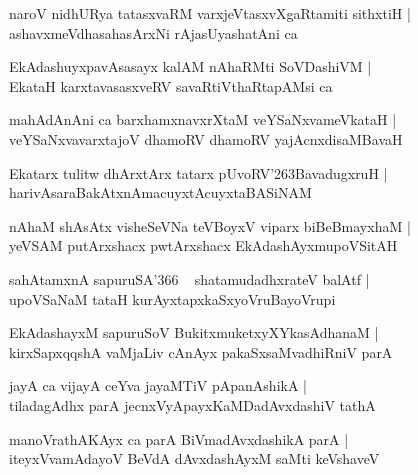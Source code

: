 \documentclass[twoside,12pt,openright]{book}
\def\S{\char'263}
\newcounter{shloka}[chapter]
\begin{document}
\begin{shloka}%
naroV nidhURya tatasxvaRM varxjeVtasxvXgaRtamiti sithxtiH |\\
ashavxmeVdhasahasArxNi rAjasUyashatAni ca 
\end{shloka}

\begin{shloka}%
EkAdashuyxpavAsasayx kalAM nAhaRMti SoVDashiVM |\\
EkataH karxtavasasxveRV savaRtiVthaRtapAMsi ca 
\end{shloka}

\begin{shloka}%
mahAdAnAni ca barxhamxnavxrXtaM veYSaNxvameVkataH |\\
veYSaNxvavarxtajoV dhamoRV dhamoRV yajAcnxdisaMBavaH 
\end{shloka}

\begin{shloka}%
Ekatarx tulitw dhArxtArx tatarx pUvoRV\S BavadugxruH |\\
harivAsaraBakAtxnAmacuyxtAcuyxtaBASiNAM 
\end{shloka}

\begin{shloka}%
nAhaM shAsAtx visheSeVNa teVBoyxV viparx biBeBmayxhaM |\\
yeVSAM putArxshacx pwtArxshacx EkAdashAyxmupoVSitAH 
\end{shloka}

\begin{shloka}%
sahAtamxnA sapuruSA\char'366 ~ shatamudadhxrateV balAtf |\\
upoVSaNaM tataH kurAyxtapxkaSxyoVruBayoVrupi 
\end{shloka}

\begin{shloka}%
EkAdashayxM sapuruSoV BukitxmuketxyXYkasAdhanaM |\\
kirxSapxqqshA vaMjaLiv cAnAyx pakaSxsaMvadhiRniV parA 
\end{shloka}

\begin{shloka}%
jayA ca vijayA ceYva jayaMTiV pApanAshikA |\\
tiladagAdhx parA jecnxVyApayxKaMDadAvxdashiV tathA 
\end{shloka}

\begin{shloka}%
manoVrathAKAyx ca parA BiVmadAvxdashikA parA |\\
iteyxVvamAdayoV BeVdA dAvxdashAyxM saMti keVshaveV 
\end{shloka}
\end{document}
